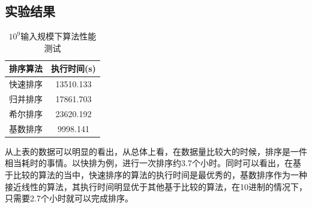 \documentclass[UTF8]{ctexart}
\begin{document}
\subsection{实验结果}


\begin{table}[H]
    \caption{$10^9$输入规模下算法性能测试}
    \label{table-1}
    \begin{center}
        \begin{tabular}{cc}
            \hline
            排序算法&   执行时间(s)\\     
            \hline
            快速排序&       13510.133\\               
            归并排序&       17861.703\\              
            希尔排序&       23620.192\\             
            基数排序&      9998.141\\                      
            \hline
        \end{tabular}  
    \end{center}
\end{table}

从上表的数据可以明显的看出，从总体上看，在数据量比较大的时候，排序是一件相当耗时的事情。以快排为例，进行一次排序约3.7个小时。同时可以看出，在基于比较的算法的当中，快速排序的算法的执行时间是最优秀的，基数排序作为一种接近线性的算法，其执行时间明显优于其他基于比较的算法，在10进制的情况下，只需要2.7个小时就可以完成排序。
\end{document}
